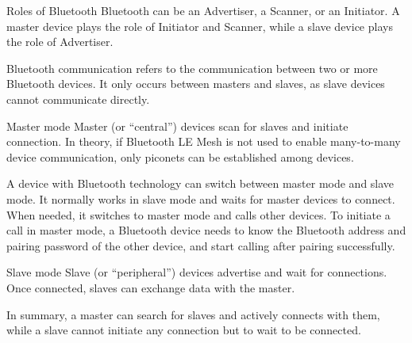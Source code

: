 \documentclass[a4paper,12pt]{book}
\begin{document}
\begin{term}{Roles of Bluetooth}
    Bluetooth can be an Advertiser, a Scanner, or an Initiator. A master device plays the role of Initiator and Scanner, while a slave device plays the role of Advertiser.
    
    Bluetooth communication refers to the communication between two or more Bluetooth devices. It only occurs between masters and slaves, as slave devices cannot communicate directly.

    \parskip 6pt
    \begin{secterm}{Master mode}
        Master (or “central”) devices scan for slaves and initiate connection. In theory, if Bluetooth LE Mesh is not used to enable many-to-many device communication, only piconets can be established among devices.
        
        \parskip 6pt
        A device with Bluetooth technology can switch between master mode and slave mode. It normally works in slave mode and waits for master devices to connect. When needed, it switches to master mode and calls other devices. To initiate a call in master mode, a Bluetooth device needs to know the Bluetooth address and pairing password of the other device, and start calling after pairing successfully.
    \end{secterm}

    \begin{secterm}{Slave mode}
        Slave (or “peripheral”) devices advertise and wait for connections. Once connected, slaves can exchange data with the master.
    \end{secterm}

    In summary, a master can search for slaves and actively connects with them, while a slave cannot initiate any connection but to wait to be connected.
\end{term}
\end{document}
